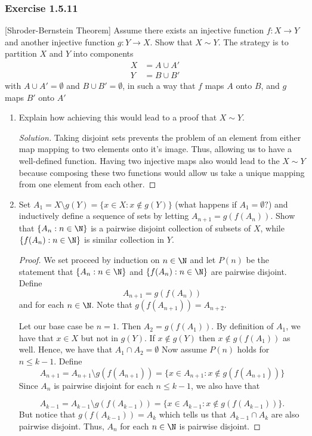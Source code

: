  \subsubsection{Exercise 1.5.11}[Shroder-Bernstein Theorem]
 Assume there exists an injective function \( f: X \to Y \) and another injective function \( g: Y \to X \). Show that \( X \sim Y \). The strategy is to partition \( X \) and \( Y \) into components
 \begin{align*}
 X &=  A \cup A' \\
 Y &= B \cup B'
\end{align*}
 with \( A \cup A' = \emptyset \) and \( B \cup B' = \emptyset\), in such a way that \( f \) maps \( A \) onto \( B \), and \( g \) maps \( B' \) onto \( A' \)
\begin{enumerate}
    \item Explain how achieving this would lead to a proof that \( X \sim Y\).
    \begin{proof}[Solution]
    Taking disjoint sets prevents the problem of an element from either map mapping to two elements onto it's image. Thus, allowing us to have a well-defined function. Having two injective maps also would lead to the \( X \sim Y \) because composing these two functions would allow us take a unique mapping from one element from each other.    
    \end{proof}
    \item Set \( A_1 = X \setminus  g(Y) = \{ x \in X: x \notin g(Y) \}\) (what happens if \( A_1 = \emptyset? \)) and inductively define a sequence of sets by letting \( A_{n+1} = g(f(A_n))\). Show that \( \{ A_{n} : n \in \N  \}\) is a pairwise disjoint collection of subsets of \( X \), while \( \{ f(A_n) : n \in \N  \}\) is similar collection in \( Y \).
    \begin{proof}
        We set proceed by induction on \( n \in \N \) and let \( P(n)\) be the statement that 
        \( \{  A_n : n \in \N  \}\) and \( \{ f(A_n) : n \in \N  \}\) are pairwise disjoint.
         Define 
        \[ A_{n+1} = g(f(A_n))\] and 
        for each \( n \in \N \). Note that \( g(f(A_{n+1})) = A_{n+2}\).

        Let our base case be \( n = 1 \). Then \( A_2 = g(f(A_1))\). By definition of \( A_1\), we have that \( x \in X \) but not in \( g(Y)\). If \( x \notin g(Y) \) then \( x \notin g(f(A_1)) \) as well. Hence, we have that \( A_1 \cap A_2 = \emptyset\)        
Now assume \( P(n)\) holds for \( n \leq k-1 \). Define  
        \[ A_{n+1} = A_{n+1} \setminus g(f(A_{n+1})) = \{  x \in A_{n+1} : x \notin g(f(A_{n+1})) \}\]
        Since \(A_n \) is pairwise disjoint for each \( n \leq k-1 \), we also have that

        \[ A_{k-1} = A_{k-1} \setminus g(f(A_{k-1})) = \{  x \in A_{k-1} : x \notin g(f(A_{k-1})) \}.\]
        But notice that \( g(f(A_{k-1})) = A_k\) which tells us that  \( A_{k-1} \cap A_{k} \) are also pairwise disjoint. 
        Thus, \( A_n \) for each \( n \in \N \) is pairwise disjoint.

    \end{proof}
\end{enumerate} 


